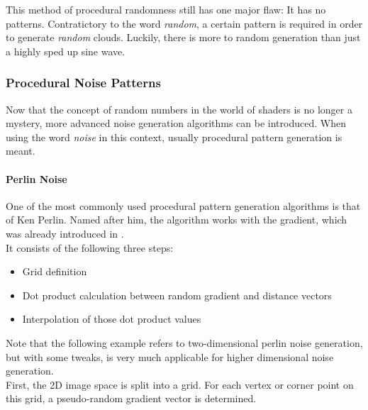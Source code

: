 \noindent
This method of procedural randomness still has one major flaw: It has no patterns. Contratictory to the word \textit{random}, a certain pattern is required in order to generate \textit{random} clouds. Luckily, there is more to random generation than just a highly sped up sine wave.

\clearpage
\subsubsection{Procedural Noise Patterns}
Now that the concept of random numbers in the world of shaders is no longer a mystery, more advanced noise generation algorithms can be introduced.
When using the word \textit{\gls{noise}} in this context, usually procedural pattern generation is meant.

\paragraph{Perlin Noise}
One of the most commonly used procedural pattern generation algorithms is that of Ken Perlin. Named after him, the algorithm works with the gradient, which was already introduced in .
\\
It consists of the following three steps: 
\begin{itemize}
    \item Grid definition
    \item Dot product calculation between random gradient and distance vectors
    \item Interpolation of those dot product values
\end{itemize}

\noindent
Note that the following example refers to two-dimensional perlin noise generation, but with some tweaks, is very much applicable for higher dimensional noise generation.
\\
First, the 2D image space is split into a grid. For each vertex or corner point on this grid, a pseudo-random gradient vector is determined.


